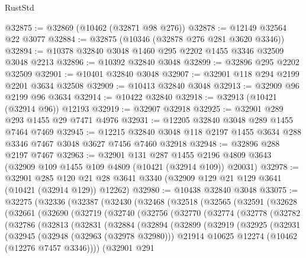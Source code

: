 \begin{lexlean}{RustStd}
\begin{coremodule}
@32875 := @32869 (@10462 (@32871 @98 @276))
@32878 := @12149 @32564 @22 @3077
@32884 := @32875 (@10346 (@32878 @276 @281 @3620 @3346))
@32894 := @10378 @32840 @3048 @1460 @295 @2202 @1455 @3346 @32509 @3048 @2213
@32896 := @10392 @32840 @3048
@32899 := @32896 @295 @2202 @32509
@32901 := @10401 @32840 @3048
@32907 := @32901 @118 @294 @2199 @2201 @3634 @32508
@32909 := @10413 @32840 @3048
@32913 := @32909 @96 @2199 @96 @3634
@32914 := @10422 @32840
@32918 := @32913 (@10421 (@32914 @96)) @12193
@32919 := @32907 @32918
@32925 := @32901 @289 @293 @1455 @29 @7471 @4976
@32931 := @12205 @32840 @3048 @289 @1455 @7464 @7469
@32945 := @12215 @32840 @3048 @118 @2197 @1455 @3634 @288 @3346 @7467 @3048 @3627 @7456 @7460 @32918
@32948 := @32896 @288 @2197 @7467
@32963 := @32901
    @131
    @287
    @1455
    @2196
    @4809
    @3643
    (@32909 @109 @1455 @109 @4809 (@10421 (@32914 @109)) @20031)
@32978 := @32901
    @285
    @120
    @21
    @28
    @3641
    @3340
    (@32909 @129 @21 @129 @3641 (@10421 (@32914 @129)) @12262)
@32980 := @10438 @32840 @3048
@33075 := @32275
    (@32336
      (@32387
        (@32430
          (@32468
            (@32518
              (@32565
                (@32591
                  (@32628
                    (@32661
                      (@32690
                        (@32719
                          (@32740
                            (@32756
                              (@32770
                                (@32774
                                  (@32778
                                    (@32782
                                      (@32786
                                        (@32813
                                          (@32831
                                            (@32884
                                              (@32894
                                                (@32899
                                                  (@32919
                                                    (@32925
                                                      (@32931
                                                        (@32945
                                                          (@32948 (@32963 (@32978 @32980)))
                                                          @21914
                                                          @10625
                                                          @12274
                                                          (@10462 (@12276 @7457 @3346))))
                                                      (@32901
                                                        @291

\end{coremodule}
\end{lexlean}

